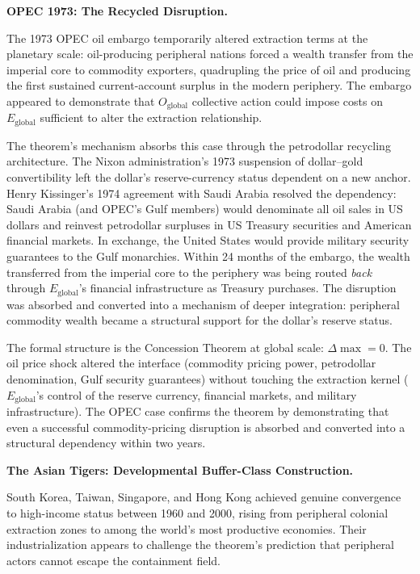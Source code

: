 \textbf{OPEC 1973: The Recycled Disruption.}

The 1973 OPEC oil embargo temporarily altered extraction terms at the planetary scale: oil-producing peripheral nations forced a wealth transfer from the imperial core to commodity exporters, quadrupling the price of oil and producing the first sustained current-account surplus in the modern periphery. The embargo appeared to demonstrate that $O_{\text{global}}$ collective action could impose costs on $E_{\text{global}}$ sufficient to alter the extraction relationship.

The theorem's mechanism absorbs this case through the petrodollar recycling architecture. The Nixon administration's 1973 suspension of dollar--gold convertibility left the dollar's reserve-currency status dependent on a new anchor. Henry Kissinger's 1974 agreement with Saudi Arabia resolved the dependency: Saudi Arabia (and OPEC's Gulf members) would denominate all oil sales in US dollars and reinvest petrodollar surpluses in US Treasury securities and American financial markets. In exchange, the United States would provide military security guarantees to the Gulf monarchies. Within 24 months of the embargo, the wealth transferred from the imperial core to the periphery was being routed \textit{back} through $E_{\text{global}}$'s financial infrastructure as Treasury purchases. The disruption was absorbed and converted into a mechanism of deeper integration: peripheral commodity wealth became a structural support for the dollar's reserve status.

The formal structure is the Concession Theorem at global scale: $\Delta\max = 0$. The oil price shock altered the interface (commodity pricing power, petrodollar denomination, Gulf security guarantees) without touching the extraction kernel ($E_{\text{global}}$'s control of the reserve currency, financial markets, and military infrastructure). The OPEC case confirms the theorem by demonstrating that even a successful commodity-pricing disruption is absorbed and converted into a structural dependency within two years.

\textbf{The Asian Tigers: Developmental Buffer-Class Construction.}

South Korea, Taiwan, Singapore, and Hong Kong achieved genuine convergence to high-income status between 1960 and 2000, rising from peripheral colonial extraction zones to among the world's most productive economies. Their industrialization appears to challenge the theorem's prediction that peripheral actors cannot escape the containment field.

